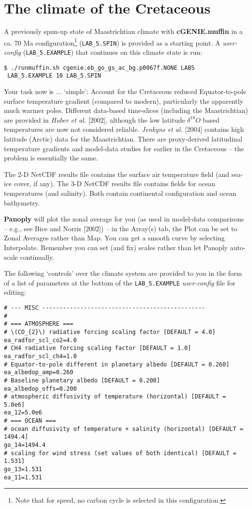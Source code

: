 \documentclass[11pt,fleqn]{book} %
\begin{document}
\newpage


\section{The climate of the Cretaceous}

A previously spun-up state of Maastrichtian climate with \textbf{cGENIE.muffin} in a ca. 70 Ma configuration\footnote{Note that for speed, no carbon cycle is selected in this configuration.} (\texttt{LAB\_5.SPIN}) is provided as a starting point. A \textit{user-config} (\texttt{LAB\_5.EXAMPLE}) that continues on this climate state is run:
\begin{verbatim}
$ ./runmuffin.sh cgenie.eb_go_gs_ac_bg.p0067f.NONE LABS
 LAB_5.EXAMPLE 10 LAB_5.SPIN
\end{verbatim}

Your task now is ... ‘simple’: Account for the Cretaceous reduced Equator-to-pole surface temperature gradient (compared to modern), particularly the apparently much warmer poles. Different data-based time-slices (including the Maastrichtian) are provided in \textit{Huber et al.} [2002], although the low latitude \(\delta^{18}O\) based temperatures are now not considered reliable. \textit{Jenkyns et al.} [2004] contains high latitude (Arctic) data for the Maastrichtian. There are proxy-derived latitudinal temperature gradients and model-data studies for earlier in the Cretaceous – the problem is essentially the same.

The 2-D NetCDF results file contains the surface air temperature field (and sea-ice cover, if any). The 3-D NetCDF results file contains fields for ocean temperatures (and salinity). Both contain continental configuration and ocean bathymetry.

\textbf{Panoply} will plot the zonal average for you (as used in model-data comparisons – e.g., see Bice and Norris [2002]) – in the Array(s) tab, the Plot can be set to Zonal Averages rather than Map. You can get a smooth curve by selecting Interpolate. Remember you can set (and fix) scales rather than let Panoply auto-scale continually.

The following ‘controls’ over the climate system are provided to you in the form of a list of parameters at the bottom of the \texttt{LAB\_5.EXAMPLE} \textit{user-config} file for editing:

\small\begin{verbatim}
# --- MISC -----------------------------------------------
#
# === ATMOSPHERE ===
# \(CO_{2}\) radiative forcing scaling factor [DEFAULT = 4.0]
ea_radfor_scl_co2=4.0
# CH4 radiative forcing scaling factor [DEFAULT = 1.0]
ea_radfor_scl_ch4=1.0
# Equator-to-pole different in planetary albedo [DEFAULT = 0.260]
ea_albedop_amp=0.260
# Baseline planetary albedo [DEFAULT = 0.200]
ea_albedop_offs=0.200
# atmospheric diffusivity of temperature (horizontal) [DEFAULT = 5.0e6]
ea_12=5.0e6
# === OCEAN ===
# ocean diffusivity of temperature + salinity (horizontal) [DEFAULT = 1494.4]
go_14=1494.4
# scaling for wind stress (set values of both identical) [DEFAULT = 1.531]
go_13=1.531
ea_11=1.531
\end{verbatim}\normalsize
\end{document}
